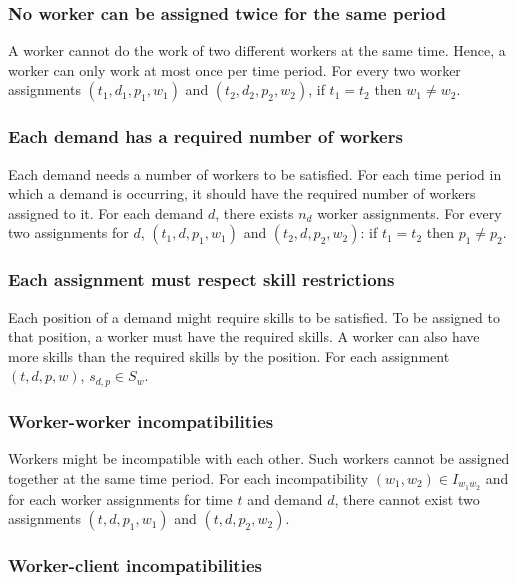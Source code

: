 \documentclass[../thesis.tex]{subfiles}
\begin{document}
\subsubsection{No worker can be assigned twice for the same period} 

A worker cannot do the work of two different workers at the same time.
Hence, a worker can only work at most once per time period.
For every two worker assignments $(t_1, d_1, p_1, w_1)$ and $(t_2, d_2, p_2, w_2)$, if $t_1 = t_2$ then $w_1 \neq w_2$.

\subsubsection{Each demand has a required number of workers}

Each demand needs a number of workers to be satisfied. 
For each time period in which a demand is occurring, it should have the required 
number of workers assigned to it.
For each demand $d$, there exists $n_d$ worker assignments. 
For every two assignments for $d$, $(t_1, d, p_1, w_1)$ and $(t_2, d, p_2, w_2)$: if $t_1 = t_2$ then $p_1 \neq p_2$.

\subsubsection{Each assignment must respect skill restrictions}

Each position of a demand might require skills to be satisfied. 
To be assigned to that position, a worker must have the required skills. 
A worker can also have more skills than the required skills by the position.
For each assignment $(t, d, p, w)$, $s_{d,p} \in S_w$.

\subsubsection{Worker-worker incompatibilities}

Workers might be incompatible with each other. Such workers cannot
be assigned together at the same time period.
For each incompatibility $(w_1, w_2) \in I_{w_1w_2}$ and for each worker assignments for time $t$ and demand $d$,
there cannot exist two assignments $(t, d, p_1, w_1)$ and $(t, d, p_2, w_2)$.

\subsubsection{Worker-client incompatibilities}
\end{document}
